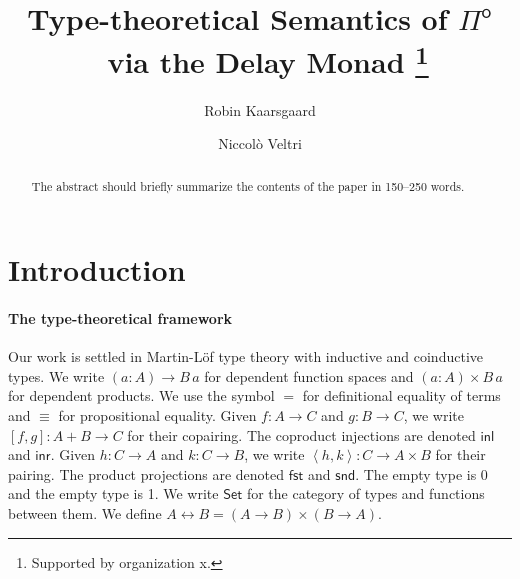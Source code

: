 \documentclass[runningheads]{llncs}
\newcommand{\Pio}{$\mathsf{\Pi}^{\mathsf{o}}$}
\newcommand{\Set}{\mathsf{Set}}
\newcommand{\U}{\mathcal{U}}
\newcommand{\copair}[2]{[#1,#2]}
\newcommand{\pair}[2]{\left< #1,#2 \right>}
\newcommand{\inl}{\mathsf{inl}}
\newcommand{\inr}{\mathsf{inr}}
\newcommand{\fst}{\mathsf{fst}}
\newcommand{\snd}{\mathsf{snd}}
\begin{document}
%
\title{Type-theoretical Semantics of \Pio\ via the Delay Monad \thanks{Supported by organization x.}}
%
%
\author{Robin Kaarsgaard  \and
Niccol\`o Veltri}
%
%
%
\maketitle              %
%
\begin{abstract}
The abstract should briefly summarize the contents of the paper in
150--250 words.

\end{abstract}

\section{Introduction}\label{sec:intro}

\paragraph{The type-theoretical framework}

Our work is settled in Martin-L\"of type theory with inductive and
coinductive types. We write $(a : A) \to B \,a$ for dependent function
spaces and $(a : A) \times B \,a$ for dependent products. We use the
symbol $=$ for definitional equality of terms and $\equiv$ for
propositional equality. Given $f : A \to C$ and
$g : B \to C$, we write $\copair f g : A + B \to C$ for their
copairing. The coproduct injections are denoted $\inl$ and $\inr$.
Given $h : C \to A$ and $k : C \to B$, we write
$\pair h k : C \to A \times B$ for their pairing. The product
projections are denoted $\fst$ and $\snd$. The empty type is 0 and the
empty type is 1. We write $\Set$ for the category of
types and functions between them.
We define $A \leftrightarrow B = (A \to B) \times (B \to A)$.
\end{document}
